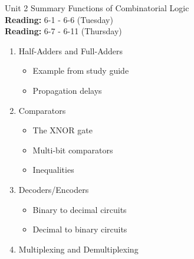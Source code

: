 \documentclass{beamer}
\begin{document}
\begin{frame}{Unit 2 Summary}
\alert{Functions of Combinatorial Logic} \\
\textbf{Reading:} 6-1 - 6-6 (Tuesday) \\
\textbf{Reading:} 6-7 - 6-11 (Thursday)
\begin{enumerate}
\item Half-Adders and Full-Adders
\begin{itemize}
\item Example from study guide
\item Propagation delays
\end{itemize}
\item Comparators
\begin{itemize}
\item The XNOR gate
\item Multi-bit comparators
\item Inequalities
\end{itemize}
\item Decoders/Encoders
\begin{itemize}
\item Binary to decimal circuits
\item Decimal to binary circuits
\end{itemize}
\item Multiplexing and Demultiplexing
\end{enumerate}
\end{frame}
\end{document}
